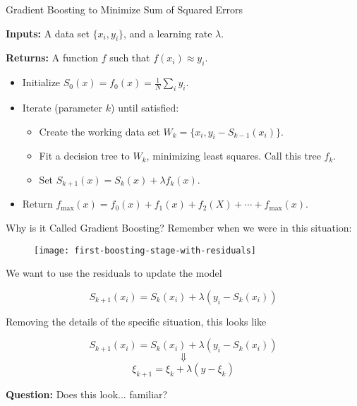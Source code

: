\begin{frame}{Gradient Boosting to Minimize Sum of Squared Errors}

\textbf{Inputs:} A data set $\{ x_i, y_i \}$, and a learning rate $\lambda$.

\textbf{Returns:} A function $f$ such that $f(x_i) \approx y_i$.

\begin{itemize}
  \item Initialize $S_0(x) = f_0(x) = \frac{1}{N} \sum_i y_i$.
  \item Iterate (parameter $k$) until satisfied: \begin{itemize}
    \item Create the working data set $W_k = \{ x_i, y_i - S_{k-1}(x_i) \}$.
    \item Fit a decision tree to $W_k$, minimizing least squares.  Call this tree $f_k$.
    \item Set $S_{k+1}(x) = S_{k}(x) + \lambda f_{k}(x)$. 
  \end{itemize}
  \item Return $f_{\text{max}}(x) = f_0(x) + f_1(x) + f_2(X) + \cdots + f_{\text{max}}(x)$.
\end{itemize}

\end{frame}
%

\begin{frame}{Why is it Called Gradient Boosting?}
Remember when we were in this situation:

  \begin{figure}
    \texttt{[image: first-boosting-stage-with-residuals]}
  \end{figure}
  
We want to use the residuals to update the model

$$ S_{k+1}(x_i) = S_{k}(x_i) + \lambda (y_i - S_{k}(x_i)) $$

\end{frame}
%

\begin{frame}
Removing the details of the specific situation, this looks like

$$ S_{k+1}(x_i) = S_{k}(x_i) + \lambda (y_i - S_{k}(x_i)) $$
$$ \Downarrow $$
$$ \xi_{k+1} = \xi_k + \lambda (y - \xi_k) $$

\textbf{Question:} Does this look... familiar?
\end{frame}
%

